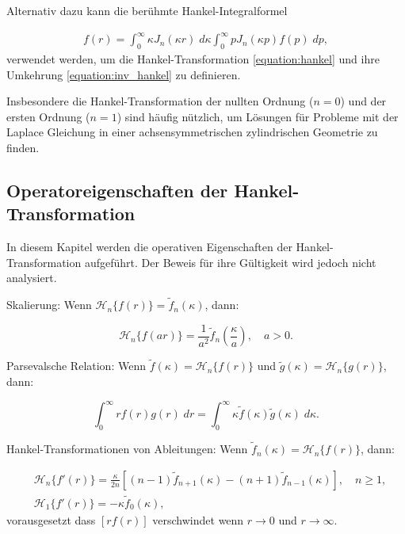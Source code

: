 Alternativ dazu kann die berühmte Hankel-Integralformel 

\begin{align*}
	f(r) = \int_{0}^{\infty}\kappa J_n(\kappa r) \; d\kappa \int_{0}^{\infty} p J_n(\kappa p)f(p) \; dp,
	\label{equation:hankel_integral_formula}
\end{align*}
verwendet werden, um die Hankel-Transformation \eqref{equation:hankel} und ihre Umkehrung \eqref{equation:inv_hankel} zu definieren.

Insbesondere die Hankel-Transformation der nullten Ordnung ($n=0$) und der ersten Ordnung ($n=1$) sind häufig nützlich, um Lösungen für Probleme mit der Laplace Gleichung in einer achsensymmetrischen zylindrischen Geometrie zu finden.

\subsection{Operatoreigenschaften der Hankel-Transformation \label{sub:op_properties_hankel}}
In diesem Kapitel werden die operativen Eigenschaften der Hankel-Transformation aufgeführt. Der Beweis für ihre Gültigkeit wird jedoch nicht analysiert.

\begin{satz}{Skalierung:}
	Wenn $\mathscr{H}_n\{f(r)\}=\tilde{f}_n(\kappa)$, dann:
	
	\begin{equation*}
		\mathscr{H}_n\{f(ar)\}=\frac{1}{a^{2}}\tilde{f}_n \left(\frac{\kappa}{a}\right), \quad a>0.
	\end{equation*}
\end{satz}

\begin{satz}{Parsevalsche Relation:}
Wenn $\tilde{f}(\kappa)=\mathscr{H}_n\{f(r)\}$ und $\tilde{g}(\kappa)=\mathscr{H}_n\{g(r)\}$, dann:

\begin{equation*}
	\int_{0}^{\infty}rf(r)g(r) \; dr = \int_{0}^{\infty}\kappa\tilde{f}(\kappa)\tilde{g}(\kappa) \; d\kappa.
\end{equation*}
\end{satz}

\begin{satz}{Hankel-Transformationen von Ableitungen:}
Wenn $\tilde{f}_n(\kappa)=\mathscr{H}_n\{f(r)\}$, dann:

\begin{align*}
	&\mathscr{H}_n\{f'(r)\}=\frac{\kappa}{2n}\left[(n-1)\tilde{f}_{n+1}(\kappa)-(n+1)\tilde{f}_{n-1}(\kappa)\right], \quad n\geq1, \\
	&\mathscr{H}_1\{f'(r)\}=-\kappa \tilde{f}_0(\kappa),
\end{align*}
vorausgesetzt dass $[rf(r)]$ verschwindet wenn $r\to0$ und $r\to\infty$.
\end{satz}

